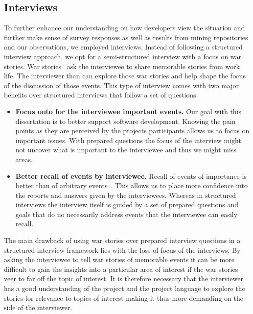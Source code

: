 \subsection{Interviews}
To further enhance our understanding on how developers view the situation and further make sense of survey responses as well as results from mining repositories and our observations, we employed interviews.
Instead of following a structured interview approach, we opt for a semi-structured interview with a focus on war stories.
War stories~\cite{lutters:ist:2007} ask the interviewee to share memorable stories from work life.
The interviewer than can explore those war stories and help shape the focus of the discussion of those events.
This type of interview comes with two major benefits over structured interviews that follow a set of questions:

\begin{itemize}
\item\textbf{Focus onto for the interviewee important events.}
Our goal with this dissertation is to better support software development.
Knowing the pain points as they are perceived by the projects participants allows us to focus on important issues.
With prepared questions the focus of the interview might not uncover what is important to the interviewee and thus we might miss areas.
\item\textbf{Better recall of events by interviewee.}
Recall of events of importance is better than of arbitrary events~\cite{lutters:ist:2007}.
This allows us to place more confidence into the reports and answers given by the interviewees.
Whereas in structured interviews the interview itself is guided by a set of prepared questions and goals that do no necessarily address events that the interviewee can easily recall.
\end{itemize}

The main drawback of using war stories over prepared interview questions in a structured interview framework lies with the loss of focus of the interviews.
By asking the interviewee to tell war stories of memorable events it can be more difficult to gain the insights into a particular area of interest if the war stories veer to far off the topic of interest.
It is therefore necessary that the interviewer has a good understanding of the project and the project language to explore the stories for relevance to topics of interest making it thus more demanding on the side of the interviewer.

